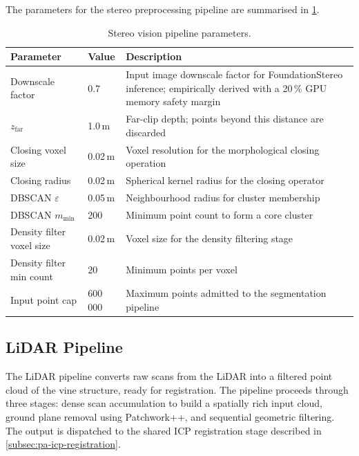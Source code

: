 The parameters for the stereo preprocessing pipeline are summarised in \cref{tab:pa-stereo-params}.

\begin{table}[htbp]
  \centering
  \caption{Stereo vision pipeline parameters.}
  \label{tab:pa-stereo-params}
  \begin{tabularx}{\textwidth}{l l X}
    \toprule
    \textbf{Parameter} & \textbf{Value} & \textbf{Description} \\
    \midrule
    Downscale factor          & 0.7        & Input image downscale factor for FoundationStereo inference; empirically derived with a 20\,\% GPU memory safety margin \\
    $z_\mathrm{far}$          & 1.0\,m     & Far-clip depth; points beyond this distance are discarded \\
    Closing voxel size        & 0.02\,m    & Voxel resolution for the morphological closing operation \\
    Closing radius            & 0.02\,m    & Spherical kernel radius for the closing operator \\
    DBSCAN $\varepsilon$      & 0.05\,m    & Neighbourhood radius for cluster membership \\
    DBSCAN $m_\mathrm{min}$   & 200        & Minimum point count to form a core cluster \\
    Density filter voxel size & 0.02\,m    & Voxel size for the density filtering stage \\
    Density filter min count  & 20         & Minimum points per voxel \\
    Input point cap           & 600\,000   & Maximum points admitted to the segmentation pipeline \\
    \bottomrule
  \end{tabularx}
\end{table}

\subsection{LiDAR Pipeline}
\label{subsec:pa-lidar-pipeline}

The LiDAR pipeline converts raw scans from the LiDAR into a filtered point cloud of the vine structure, ready for registration. The pipeline proceeds through three stages: dense scan accumulation to build a spatially rich input cloud, ground plane removal using Patchwork++, and sequential geometric filtering. The output is dispatched to the shared ICP registration stage described in \cref{subsec:pa-icp-registration}.

